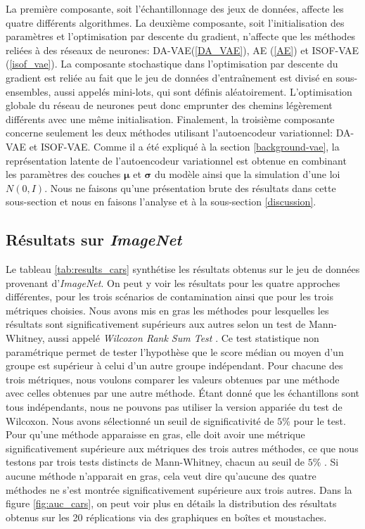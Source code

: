 La première composante, soit l'échantillonnage des jeux de données, affecte les quatre différents algorithmes. La deuxième composante, soit l'initialisation des paramètres et l'optimisation par descente du gradient, n'affecte que les méthodes reliées à des réseaux de neurones: DA-VAE(\ref{DA_VAE}), AE (\ref{AE}) et ISOF-VAE (\ref{isof_vae}). La composante stochastique dans l'optimisation par descente du gradient est reliée au fait que le jeu de données d'entraînement est divisé en sous-ensembles, aussi appelés mini-lots, qui sont définis aléatoirement. L'optimisation globale du réseau de neurones peut donc emprunter des chemins légèrement différents avec une même initialisation. Finalement, la troisième composante concerne seulement les deux méthodes utilisant l'autoencodeur variationnel: DA-VAE et ISOF-VAE. Comme il a été expliqué à la section \ref{background-vae}, la représentation latente de l'autoencodeur variationnel est obtenue en combinant les paramètres des couches $\boldsymbol{\mu}$ et $\boldsymbol{\sigma}$ du modèle ainsi que la simulation d'une loi $N(0,I)$. Nous ne faisons qu'une présentation brute des résultats dans cette sous-section et nous en faisons l'analyse et \DIFdelbegin {}\DIFdelend \DIFaddbegin {}\DIFaddend à la sous-section \ref{discussion}.


\subsection{Résultats sur \textit{ImageNet}} \label{results:imagenet}

Le tableau \ref{tab:results_cars} synthétise les résultats obtenus sur le jeu de données provenant d'\textit{ImageNet}. On peut y voir les résultats pour les quatre approches différentes, pour les trois scénarios de contamination ainsi que pour les trois métriques choisies. Nous avons mis en gras les méthodes pour lesquelles les résultats sont significativement supérieurs aux autres selon un test de Mann-Whitney, aussi appelé \textit{Wilcoxon Rank Sum Test} \citep{Mann47}. Ce test statistique non paramétrique permet de tester l'hypothèse que le score médian ou moyen d'un groupe est supérieur à celui d'un autre groupe indépendant. Pour chacune des trois métriques, nous voulons comparer les valeurs obtenues par une méthode avec celles obtenues par une autre méthode. Étant donné que les échantillons sont tous indépendants, nous ne pouvons pas utiliser la version appariée du test de Wilcoxon. Nous avons sélectionné un seuil de significativité de $5 \%$ pour le test. Pour qu'une méthode apparaisse en gras, elle doit avoir une métrique significativement supérieure aux métriques des trois autres méthodes, ce que nous testons par trois tests distincts de Mann-Whitney, chacun au seuil de $5 \%$ . Si aucune méthode n'apparait en gras, cela veut dire qu'aucune des quatre méthodes ne s'est montrée significativement supérieure aux trois autres. Dans la figure \ref{fig:auc_cars}, on peut voir plus en détails la distribution des résultats obtenus sur les 20 réplications via des graphiques en boîtes et moustaches.

